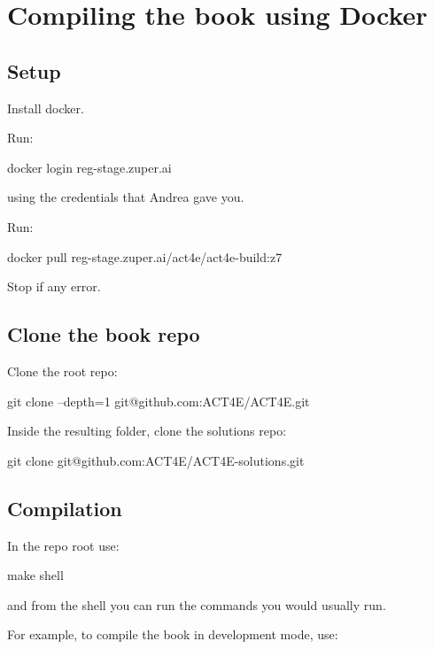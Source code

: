 

\section{Compiling the book using Docker}

\subsection{Setup}

Install docker.

Run:

\begin{console}
    docker login reg-stage.zuper.ai
\end{console}

using the credentials that Andrea gave you.

Run:

\begin{console}
    docker pull reg-stage.zuper.ai/act4e/act4e-build:z7
\end{console}

Stop if any error.

\subsection{Clone the book repo}

Clone the root repo:

\begin{console}
    git clone --depth=1 git@github.com:ACT4E/ACT4E.git
\end{console}

Inside the resulting folder, clone the solutions repo:

\begin{console}
    git clone git@github.com:ACT4E/ACT4E-solutions.git
\end{console}

\subsection{Compilation}

In the repo root use:

\begin{console}
    make shell
\end{console}

and from the shell you can run the commands you would usually run.

For example, to compile the book in development mode, use:


